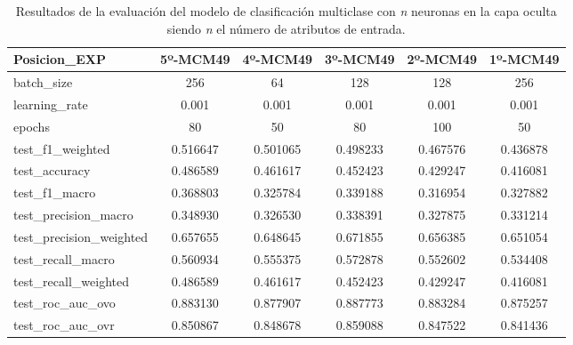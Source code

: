 \begin{table}[H]
\begin{tabular}{|>{\columncolor[HTML]{E0FFFF}}l|c|c|c|c|c|}
\hline
Posicion\_EXP & 5º-MCM49 & 4º-MCM49 & 3º-MCM49 & 2º-MCM49 & 1º-MCM49 \\
\hline
\cellcolor[HTML]{E0FFFF}batch\_size & \cellcolor[HTML]{66ffa8}256 & \cellcolor[HTML]{66ffa8}64 & \cellcolor[HTML]{66ffa8}128 & \cellcolor[HTML]{66ffa8}128 & \cellcolor[HTML]{66ffa8}256 \\
\cellcolor[HTML]{E0FFFF}learning\_rate & \cellcolor[HTML]{f99595}0.001 & \cellcolor[HTML]{f99595}0.001 & \cellcolor[HTML]{f99595}0.001 & \cellcolor[HTML]{f99595}0.001 & \cellcolor[HTML]{f99595}0.001 \\
\cellcolor[HTML]{E0FFFF}epochs & \cellcolor[HTML]{b1bafb}80 & \cellcolor[HTML]{b1bafb}50 & \cellcolor[HTML]{b1bafb}80 & \cellcolor[HTML]{b1bafb}100 & \cellcolor[HTML]{b1bafb}50 \\
\cellcolor[HTML]{E0FFFF}test\_f1\_weighted & 0.516647 & 0.501065 & 0.498233 & 0.467576 & 0.436878 \\
\cellcolor[HTML]{E0FFFF}test\_accuracy & 0.486589 & 0.461617 & 0.452423 & 0.429247 & 0.416081 \\
\cellcolor[HTML]{E0FFFF}test\_f1\_macro & 0.368803 & 0.325784 & 0.339188 & 0.316954 & 0.327882 \\
\cellcolor[HTML]{E0FFFF}test\_precision\_macro & 0.348930 & 0.326530 & 0.338391 & 0.327875 & 0.331214 \\
\cellcolor[HTML]{E0FFFF}test\_precision\_weighted & 0.657655 & 0.648645 & 0.671855 & 0.656385 & 0.651054 \\
\cellcolor[HTML]{E0FFFF}test\_recall\_macro & 0.560934 & 0.555375 & 0.572878 & 0.552602 & 0.534408 \\
\cellcolor[HTML]{E0FFFF}test\_recall\_weighted & 0.486589 & 0.461617 & 0.452423 & 0.429247 & 0.416081 \\
\cellcolor[HTML]{E0FFFF}test\_roc\_auc\_ovo & 0.883130 & 0.877907 & 0.887773 & 0.883284 & 0.875257 \\
\cellcolor[HTML]{E0FFFF}test\_roc\_auc\_ovr & 0.850867 & 0.848678 & 0.859088 & 0.847522 & 0.841436 \\
\hline
\end{tabular}
    \caption{Resultados de la evaluación del modelo de clasificación multiclase con \textit{n} neuronas en la capa oculta siendo \textit{n} el número de atributos de entrada.}
    \label{fig:EVALMCM49}
\end{table}

